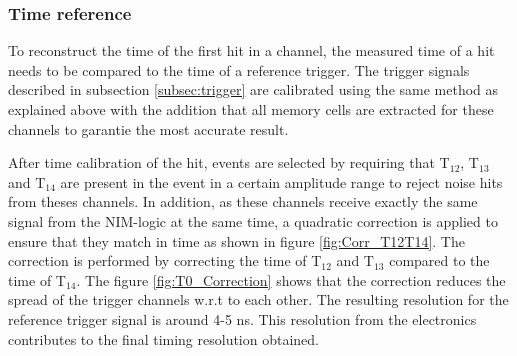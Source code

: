\subsubsection{Time reference}
\label{subsection:time_ref}

To reconstruct the time of the first hit in a channel, the measured time of a hit needs to be compared to the time of a reference trigger. The trigger signals described in subsection \ref{subsec:trigger} are calibrated using the same method as explained above with the addition that all memory cells are extracted for these channels to garantie the most accurate result.

After time calibration of the hit, events are selected by requiring that T$_{12}$, T$_{13}$ and T$_{14}$ are present in the event in a certain amplitude range to reject noise hits from theses channels. In addition, as these channels receive exactly the same signal from the NIM-logic at the same time, a quadratic correction is applied to ensure that they match in time as shown in figure \ref{fig:Corr_T12T14}. The correction is performed by correcting the time of T$_{12}$ and T$_{13}$ compared to the time of T$_{14}$. The figure \ref{fig:T0_Correction} shows that the correction reduces the spread of the trigger channels w.r.t to each other. The resulting resolution for the reference trigger signal is around 4-5 ns. This resolution from the electronics contributes to the final timing resolution obtained.

